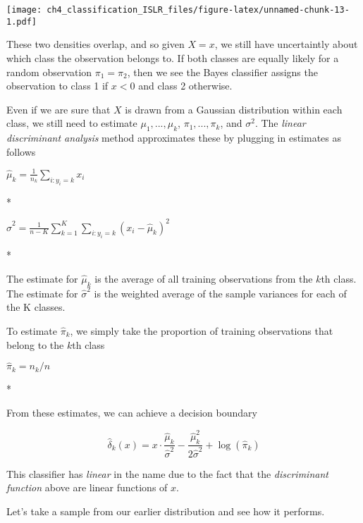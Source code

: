 \documentclass[
]{article}
\begin{document}
\texttt{[image: ch4\_classification\_ISLR\_files/figure-latex/unnamed-chunk-13-1.pdf]}

These two densities overlap, and so given \(X = x\), we still have
uncertaintly about which class the observation belongs to. If both
classes are equally likely for a random observation \(\pi_1 = \pi_2\),
then we see the Bayes classifier assigns the observation to class 1 if
\(x < 0\) and class 2 otherwise.

Even if we are sure that \(X\) is drawn from a Gaussian distribution
within each class, we still need to estimate \(\mu_1,...,\mu_k\),
\(\pi_1,...,\pi_k\), and \(\sigma^2\). The \emph{linear discriminant
analysis} method approximates these by plugging in estimates as follows

\(\hat{\mu}_k = \frac{1}{n_k}\sum_{i:y_i=k}{x_i}\)

*

\(\hat{\sigma}^2 = \frac{1}{n-K}\sum_{k=1}^{K}\sum_{i:y_i=k}{(x_i-\hat{\mu}_k)^2}\)

*

The estimate for \(\hat{\mu}_k\) is the average of all training
observations from the \(k\)th class. The estimate for \(\hat{\sigma}^2\)
is the weighted average of the sample variances for each of the K
classes.

To estimate \(\hat{\pi}_k\), we simply take the proportion of training
observations that belong to the \(k\)th class

\(\hat{\pi}_k = n_k/n\)

*

From these estimates, we can achieve a decision boundary

\[
\hat{\delta}_{k}(x)=x \cdot \frac{\hat{\mu}_{k}}{\hat{\sigma}^{2}}-\frac{\hat{\mu}_{k}^{2}}{2 \hat{\sigma}^{2}}+\log \left(\hat{\pi}_{k}\right)
\]

This classifier has \emph{linear} in the name due to the fact that the
\emph{discriminant function} above are linear functions of \(x\).

Let's take a sample from our earlier distribution and see how it
performs.
\end{document}
